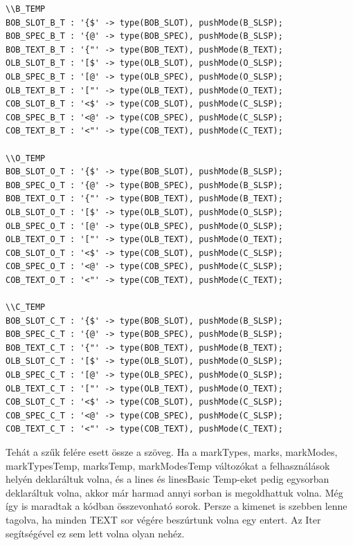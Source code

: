 \begin{verbatim}
\\B_TEMP
BOB_SLOT_B_T : '{$' -> type(BOB_SLOT), pushMode(B_SLSP);
BOB_SPEC_B_T : '{@' -> type(BOB_SPEC), pushMode(B_SLSP);
BOB_TEXT_B_T : '{"' -> type(BOB_TEXT), pushMode(B_TEXT);
OLB_SLOT_B_T : '[$' -> type(OLB_SLOT), pushMode(O_SLSP);
OLB_SPEC_B_T : '[@' -> type(OLB_SPEC), pushMode(O_SLSP);
OLB_TEXT_B_T : '["' -> type(OLB_TEXT), pushMode(O_TEXT);
COB_SLOT_B_T : '<$' -> type(COB_SLOT), pushMode(C_SLSP);
COB_SPEC_B_T : '<@' -> type(COB_SPEC), pushMode(C_SLSP);
COB_TEXT_B_T : '<"' -> type(COB_TEXT), pushMode(C_TEXT);

\\O_TEMP
BOB_SLOT_O_T : '{$' -> type(BOB_SLOT), pushMode(B_SLSP);
BOB_SPEC_O_T : '{@' -> type(BOB_SPEC), pushMode(B_SLSP);
BOB_TEXT_O_T : '{"' -> type(BOB_TEXT), pushMode(B_TEXT);
OLB_SLOT_O_T : '[$' -> type(OLB_SLOT), pushMode(O_SLSP);
OLB_SPEC_O_T : '[@' -> type(OLB_SPEC), pushMode(O_SLSP);
OLB_TEXT_O_T : '["' -> type(OLB_TEXT), pushMode(O_TEXT);
COB_SLOT_O_T : '<$' -> type(COB_SLOT), pushMode(C_SLSP);
COB_SPEC_O_T : '<@' -> type(COB_SPEC), pushMode(C_SLSP);
COB_TEXT_O_T : '<"' -> type(COB_TEXT), pushMode(C_TEXT);

\\C_TEMP
BOB_SLOT_C_T : '{$' -> type(BOB_SLOT), pushMode(B_SLSP);
BOB_SPEC_C_T : '{@' -> type(BOB_SPEC), pushMode(B_SLSP);
BOB_TEXT_C_T : '{"' -> type(BOB_TEXT), pushMode(B_TEXT);
OLB_SLOT_C_T : '[$' -> type(OLB_SLOT), pushMode(O_SLSP);
OLB_SPEC_C_T : '[@' -> type(OLB_SPEC), pushMode(O_SLSP);
OLB_TEXT_C_T : '["' -> type(OLB_TEXT), pushMode(O_TEXT);
COB_SLOT_C_T : '<$' -> type(COB_SLOT), pushMode(C_SLSP);
COB_SPEC_C_T : '<@' -> type(COB_SPEC), pushMode(C_SLSP);
COB_TEXT_C_T : '<"' -> type(COB_TEXT), pushMode(C_TEXT);
\end{verbatim}

Tehát a szűk felére esett össze a szöveg.
Ha a markTypes, marks, markModes, markTypesTemp, marksTemp, markModesTemp változókat a felhasználások helyén deklaráltuk volna,
és a lines és linesBasic Temp-eket pedig egysorban deklaráltuk volna, akkor már harmad annyi sorban is megoldhattuk volna.
Még így is maradtak a kódban összevonható sorok.
Persze a kimenet is szebben lenne tagolva, ha minden TEXT sor végére beszúrtunk volna egy entert.
Az Iter segítségével ez sem lett volna olyan nehéz.